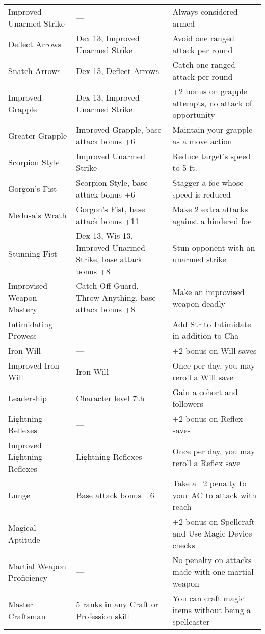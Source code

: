 \begin{table*}
\begin{tabularx}{\linewidth}{lXl}
Improved Unarmed Strike & --- & Always considered armed\\
\enspace Deflect Arrows & Dex 13,  Improved Unarmed Strike & Avoid one ranged attack per round\\
\enspace \enspace Snatch Arrows & Dex 15, Deflect Arrows & Catch one ranged attack per round\\
\enspace Improved Grapple & Dex 13, Improved Unarmed Strike & +2 bonus on grapple attempts, no attack of opportunity\\
\enspace \enspace Greater Grapple & Improved Grapple, base attack bonus +6 & Maintain your grapple as a move action\\
\enspace Scorpion Style & Improved Unarmed Strike & Reduce target's speed to 5 ft.\\
\enspace \enspace Gorgon's Fist & Scorpion Style, base attack bonus +6 & Stagger a foe whose speed is reduced\\
\enspace \enspace \enspace Medusa's Wrath & Gorgon's Fist, base attack bonus +11 & Make 2 extra attacks against a hindered foe\\
\enspace Stunning Fist & Dex 13, Wis 13, Improved Unarmed Strike, base attack bonus +8 & Stun opponent with an unarmed strike\\
Improvised Weapon Mastery & Catch Off-Guard, Throw Anything, base attack bonus +8 & Make an improvised weapon deadly\\
Intimidating Prowess & --- & Add Str to Intimidate in addition to Cha \\
Iron Will & --- & +2 bonus on Will saves\\
\enspace Improved Iron Will & Iron Will & Once per day, you may reroll a Will save\\
Leadership & Character level 7th & Gain a cohort and followers\\
Lightning Reflexes & --- & +2 bonus on Reflex saves\\
\enspace Improved Lightning Reflexes & Lightning Reflexes & Once per day, you may reroll a Reflex save\\
Lunge & Base attack bonus +6 & Take a –2 penalty to your AC to attack with reach\\
Magical Aptitude & --- & +2 bonus on Spellcraft and Use Magic Device checks\\
Martial Weapon Proficiency & --- & No penalty on attacks made with one martial weapon\\
Master Craftsman & 5 ranks in any Craft or Profession skill & You can craft magic items without being a spellcaster\\

\end{tabularx}
\end{table*}
